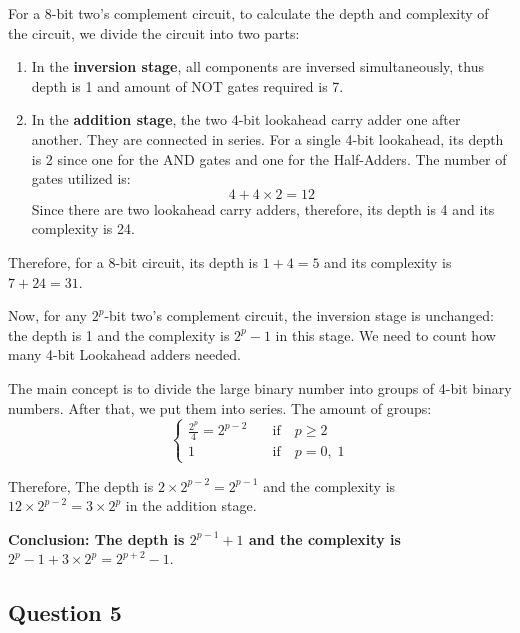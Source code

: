 \documentclass[conference]{IEEEtran}
\begin{document}
For a 8-bit two's complement circuit, to calculate the depth and complexity of the circuit, we divide the circuit into two parts:
\begin{enumerate}
    \item In the \textbf{inversion stage}, all components are inversed simultaneously, thus depth is 1 and amount of NOT gates required is 7.
    \item In the \textbf{addition stage}, the two 4-bit lookahead carry adder one after another. They are connected in series.
          For a single 4-bit lookahead, its depth is 2 since one for the AND gates and one for the Half-Adders. The number of gates utilized is:
          \begin{equation}
            4 +4 \times 2 = 12
          \end{equation}
          Since there are two lookahead carry adders, therefore, its depth is 4 and its complexity is 24.

\end{enumerate}

Therefore, for a 8-bit circuit, its depth is $1+4=5$ and its complexity is $7+24=31$.

Now, for any $2^p$-bit two's complement circuit, the inversion stage is unchanged: the depth is 1 and the complexity is $2^p-1$ in this stage. We need to count how many 4-bit Lookahead adders needed.

The main concept is to divide the large binary number into groups of 4-bit binary numbers. After that, we put them into series. The amount of groups: 
\begin{equation}
    \begin{cases}
        \frac{2^p}{4} = 2^{p-2} \quad &\text{if} \quad p \geq 2     \\
        1 &\text{if} \quad  p = 0, \; 1
    \end{cases}
\end{equation}

Therefore, The depth is $2\times 2^{p-2} = 2 ^{p-1}$ and the complexity is $12 \times 2^{p-2} = 3 \times 2^p$ in the addition stage.


\textbf{Conclusion: The depth is $2^{p-1} + 1$ and the complexity is $2^p - 1 + 3 \times 2^p = 2^{p+2}-1$}.



\subsection{Question 5}
\end{document}

